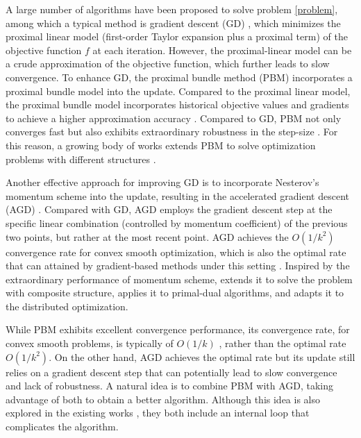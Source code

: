 \documentclass[letterpaper, 10 pt, conference]{ieeeconf}  %
\begin{document}
A large number of algorithms have been proposed to solve problem \eqref{problem}, among which a typical method is gradient descent (GD) \cite{boyd2004convex}, which minimizes the proximal linear model (first-order Taylor expansion plus a proximal term) of the objective function $f$ at each iteration.
However, the proximal-linear model can be a crude
approximation of the objective function, which further leads to slow convergence. To enhance GD, the proximal bundle method (PBM) \cite{lemarechal1975extension,diaz2023optimal,Nesterov2021memory} incorporates a proximal bundle model into the update. Compared to the proximal linear model, the proximal bundle model incorporates historical objective values and gradients to achieve a higher approximation accuracy \cite{Nesterov2021memory}.  Compared to GD, PBM not only converges fast but also exhibits extraordinary robustness in the step-size \cite{lemarechal1993convex}. For this reason, a growing body of works extends PBM to solve optimization problems with different structures  \cite{zhu2025historical,cederberg2025an,hare2010redistributed,de2019proximal}. 

Another effective approach for improving GD is to incorporate Nesterov's momentum scheme into the update, resulting in the accelerated gradient descent (AGD) \cite{nesterov1983method,Beck09FISTA,d2021acceleration}. Compared with GD, AGD employs the gradient descent step at the specific linear combination (controlled by momentum coefficient) of the previous two points, but rather at the most recent point. AGD achieves the $O(1/k^2)$ convergence rate for convex smooth optimization, which is also the optimal rate that can attained by gradient-based methods under this setting \cite[Section 2.1.2]{nesterov2018lectures}. Inspired by the extraordinary performance of momentum scheme, \cite{Beck09FISTA} extends it to solve the problem with composite structure, \cite{xu2017accelerated} applies it to primal-dual algorithms, and \cite{huang2025accelerated} adapts it to the distributed optimization.

While PBM exhibits excellent convergence performance, its convergence rate, for convex smooth problems, is typically of $O(1/k)$ \cite{Nesterov2021memory,diaz2023optimal}, rather than the optimal rate $O(1/k^2)$. On the other hand, AGD achieves the optimal rate but its update still relies on a gradient descent step that can potentially lead to slow convergence and lack of robustness. A natural idea is to combine PBM with AGD, taking advantage of both to obtain a better algorithm. Although this idea is also explored in the existing works \cite{liao2025accelerated,fersztand2025acceleration}, they both include an internal loop that complicates the algorithm.
\end{document}

